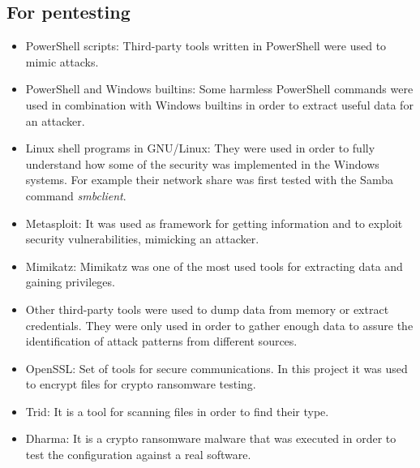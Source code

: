 \subsection{For pentesting}
\begin{itemize}
	\item PowerShell scripts: Third-party tools written in PowerShell were used to mimic attacks.
	\item PowerShell and Windows builtins: Some harmless PowerShell commands were used in combination with Windows builtins in order to extract useful data for an attacker.
	\item Linux shell programs in GNU/Linux: They were used in order to fully understand how some of the security was implemented in the Windows systems. For example their network share was first tested with the Samba command \textit{smbclient}.
	\item Metasploit: It was used as framework\cite{metasploit} for getting information and to exploit security vulnerabilities, mimicking an attacker.
	\item Mimikatz: Mimikatz\cite{mimikatz_github} was one of the most used tools for extracting data and gaining privileges.
	\item Other third-party tools were used to dump data from memory or extract credentials. They were only used in order to gather enough data to assure the identification of attack patterns from different sources.
	\item OpenSSL\cite{openssl}: Set of tools for secure communications. In this project it was used to encrypt files for crypto ransomware testing.
	\item Trid\cite{trid}: It is a tool for scanning files in order to find their type.
	\item Dharma\cite{dharma}: It is a crypto ransomware malware that was executed in order to test the configuration against a real software.
\end{itemize}

